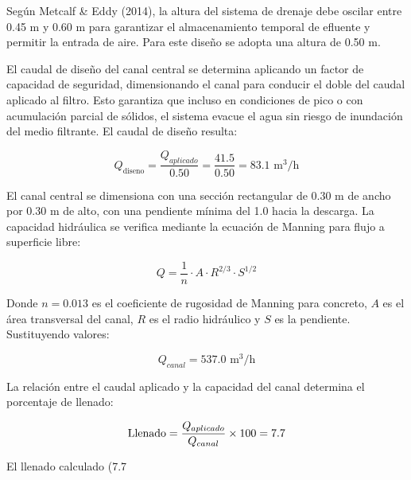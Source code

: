 \documentclass[12pt,a4paper]{article}
\begin{document}
Según Metcalf \& Eddy (2014), la altura del sistema de drenaje debe oscilar entre 0.45 m y 0.60 m para garantizar el almacenamiento temporal de efluente y permitir la entrada de aire. Para este diseño se adopta una altura de 0.50 m.

El caudal de diseño del canal central se determina aplicando un factor de capacidad de seguridad, dimensionando el canal para conducir el doble del caudal aplicado al filtro. Esto garantiza que incluso en condiciones de pico o con acumulación parcial de sólidos, el sistema evacue el agua sin riesgo de inundación del medio filtrante. El caudal de diseño resulta:

\begin{equation}
Q_{\text{diseno}} = \frac{Q_{aplicado}}{0.50} = \frac{41.5}{0.50} = 83.1 \text{ m}^3\text{/h}
\end{equation}

El canal central se dimensiona con una sección rectangular de 0.30 m de ancho por 0.30 m de alto, con una pendiente mínima del 1.0 hacia la descarga. La capacidad hidráulica se verifica mediante la ecuación de Manning para flujo a superficie libre:

\begin{equation}
Q = \frac{1}{n} \cdot A \cdot R^{2/3} \cdot S^{1/2}
\end{equation}

Donde $n = 0.013$ es el coeficiente de rugosidad de Manning para concreto, $A$ es el área transversal del canal, $R$ es el radio hidráulico y $S$ es la pendiente. Sustituyendo valores:

\begin{equation}
Q_{canal} = 537.0 \text{ m}^3\text{/h}
\end{equation}

La relación entre el caudal aplicado y la capacidad del canal determina el porcentaje de llenado:

\begin{equation}
\text{Llenado} = \frac{Q_{aplicado}}{Q_{canal}} \times 100 = 7.7\\%
\end{equation}

El llenado calculado (7.7%
\end{document}

